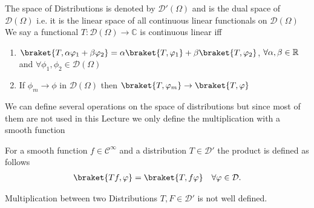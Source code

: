 \begin{definition}[Distribution]
 The space of Distributions is denoted by $\mathcal{D}'(\Omega )$  and is the dual space of $\mathcal{D}(\Omega)$
 i.e. it is the linear space of all continuous linear functionals on $\mathcal{D}(\Omega )$ \\[1ex]
 We say a functional $T :\mathcal{D}(\Omega ) \to \mathbb{C}$ is continuous linear iff 
 \begin{enumerate}
   \item $\braket{T,\alpha \phi_1+ \beta \phi_2} = \alpha \braket{T,\phi_1} + \beta \braket{T,\phi_2}$, $\forall \alpha,\beta\in \mathbb{R}$ and $\forall \phi_1,\phi_2\in\mathcal{D}(\Omega)$
   \item If $\phi_m \to  \phi $ in $\mathcal{D}(\Omega )$ then $\braket{T,\phi_m} \to \braket{T,\phi }$
 \end{enumerate}
\end{definition}
We can define several operations on the space of distributions but since most of them are not used in this Lecture 
we only define the multiplication with a smooth function 
\begin{definition}
For a smooth function $f \in  \mathcal{C}^{\infty} $ and a distribution $T \in \mathcal{D}'$ the product is defined as follows 
\begin{align*}
  \braket{Tf,\phi } = \braket{T,f \phi} \quad \forall \phi  \in  \mathcal{D}
.\end{align*}
\end{definition}
\begin{remark}
 Multiplication between two Distributions $T,F \in  \mathcal{D}'$ is not well defined.
\end{remark}

